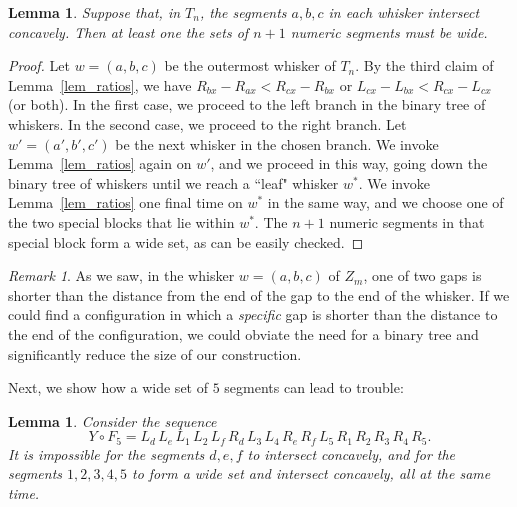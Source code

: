\documentclass[11pt]{article}
\newtheorem{lemma}[theorem]{Lemma}
\theoremstyle{definition}
\theoremstyle{remark}
\newtheorem{remark}[theorem]{Remark}
\begin{document}
\begin{lemma}\label{lemma_one_wide}
Suppose that, in $T_n$, the segments $a,b,c$ in each whisker intersect concavely. Then at least one the sets of $n+1$ numeric segments must be wide.
\end{lemma}

\begin{proof}
Let $w=(a,b,c)$ be the outermost whisker of $T_n$. By the third claim of Lemma~\ref{lem_ratios}, we have $R_{bx} - R_{ax} < R_{cx} - R_{bx}$ or $L_{cx}-L_{bx} < R_{cx} - L_{cx}$ (or both). In the first case, we proceed to the left branch in the binary tree of whiskers. In the second case, we proceed to the right branch. Let $w'=(a',b',c')$ be the next whisker in the chosen branch. We invoke Lemma~\ref{lem_ratios} again on $w'$, and we proceed in this way, going down the binary tree of whiskers until we reach a ``leaf" whisker $w^*$. We invoke Lemma~\ref{lem_ratios} one final time on $w^*$ in the same way, and we choose one of the two special blocks that lie within $w^*$. The $n+1$ numeric segments in that special block form a wide set, as can be easily checked.
\end{proof}

\begin{remark}\label{remark_binary_tree}
As we saw, in the whisker $w=(a,b,c)$ of $Z_m$, one of two gaps is shorter than the distance from the end of the gap to the end of the whisker. If we could find a configuration in which a \emph{specific} gap is shorter than the distance to the end of the configuration, we could obviate the need for a binary tree and significantly reduce the size of our construction.
\end{remark}

Next, we show how a wide set of $5$ segments can lead to trouble:

\begin{lemma}\label{lem_smash_wide}
Consider the sequence
\begin{equation*}
Y\circ F_5 = L_d\, L_e\, L_1\, L_2\, L_f\, R_d\, L_3\, L_4\, R_e\, R_f\, L_5\, R_1\, R_2\, R_3\, R_4\, R_5.
\end{equation*}
It is impossible for the segments $d,e,f$ to intersect concavely, and for the segments $1,2,3,4,5$ to form a wide set and intersect concavely, all at the same time.
\end{lemma}
\end{document}
